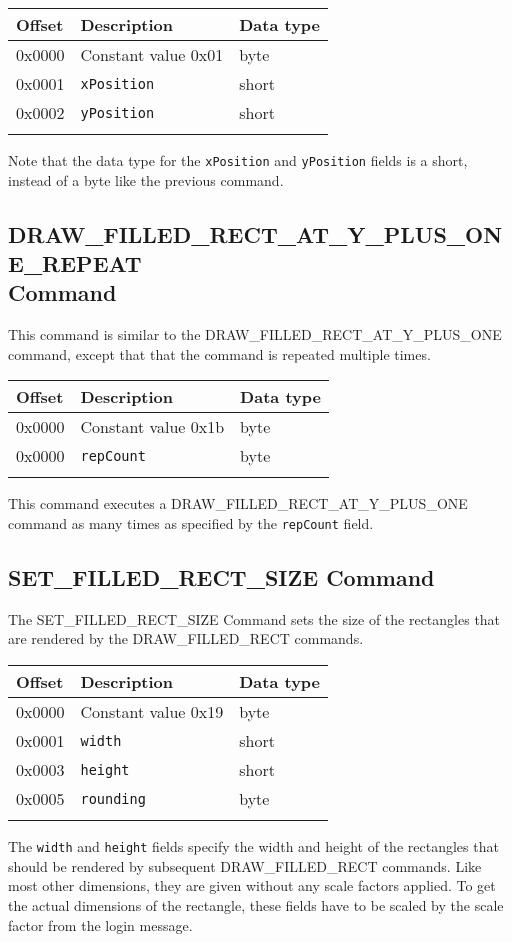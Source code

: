 \documentclass{article}
\newcommand{\field}[1]{\textcolor{fieldColor}{\texttt{#1}}}
\newenvironment{bytelisting}
{\ttfamily \begin{center} \begin{tabular}{l l l} Offset & Description & Data type \\ \hline}
{\normalfont \end{tabular} \end{center}}
\begin{document}
\begin{bytelisting}
0x0000 & Constant value 0x01 & byte \\
0x0001 & \field{xPosition} & short \\
0x0002 & \field{yPosition} & short \\
\end{bytelisting}

Note that the data type for the \field{xPosition} and \field{yPosition} fields is a short, instead of a byte like the previous command.

\subsection{DRAW\_FILLED\_RECT\_AT\_Y\_PLUS\_ONE\_REPEAT \\ Command}
This command is similar to the DRAW\_FILLED\_RECT\_AT\_Y\_PLUS\_ONE command, except that that the command is repeated multiple times.

\begin{bytelisting}
0x0000 & Constant value 0x1b & byte \\
0x0000 & \field{repCount} & byte \\
\end{bytelisting}

This command executes a DRAW\_FILLED\_RECT\_AT\_Y\_PLUS\_ONE command as many times as specified by the \field{repCount} field.

\subsection{SET\_FILLED\_RECT\_SIZE Command}
The SET\_FILLED\_RECT\_SIZE Command sets the size of the rectangles that are rendered by the DRAW\_FILLED\_RECT commands.

\begin{bytelisting}
0x0000 & Constant value 0x19 & byte \\
0x0001 & \field{width} & short \\
0x0003 & \field{height} & short \\
0x0005 & \field{rounding} & byte \\
\end{bytelisting}

The \field{width} and \field{height} fields specify the width and height of the rectangles that should be rendered by subsequent DRAW\_FILLED\_RECT commands. Like most other dimensions, they are given
without any scale factors applied. To get the actual dimensions of the rectangle, these fields have to be scaled by the scale factor from the login message.
\end{document}
